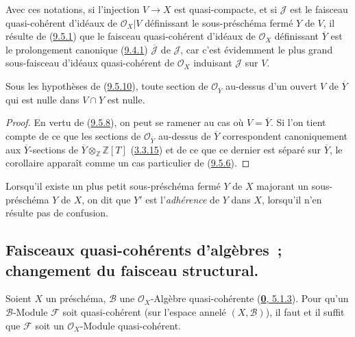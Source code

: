 Avec ces notations, si l'injection $V\to X$ est quasi-compacte, et si
$\mathscr{J}$ est le faisceau quasi-cohérent d'idéaux de
$\mathscr{O}_X|V$ définissant le sous-préschéma fermé $Y$ de $V$, il résulte
de (\hyperref[I.9.5.1-fr]{9.5.1}) que le faisceau quasi-cohérent d'idéaux de
$\mathscr{O}_X$ définissant $\overline{Y}$ est le prolongement canonique
(\hyperref[I.9.4.1-fr]{9.4.1}) $\overline{\mathscr{J}}$ de $\mathscr{J}$,
car c'est évidemment le plus grand sous-faisceau d'idéaux quasi-cohérent de
$\mathscr{O}_X$ induisant $\mathscr{J}$ sur $V$.
\begin{corollary}[9.5.11]
\label{I.9.5.11-fr}
Sous les hypothèses de (\hyperref[I.9.5.10-fr]{9.5.10}), toute section de
$\mathscr{O}_{\overline{Y}}$ au-dessus d'un ouvert $V$ de $\overline{Y}$
qui est nulle dans $V\cap Y$ est nulle.
\end{corollary}

\begin{proof}
En vertu de (\hyperref[I.9.5.8-fr]{9.5.8}), on peut se ramener au cas où
$V=\overline{Y}$. Si l'on tient compte de ce que les sections de
$\mathscr{O}_{\overline{Y}}$ au-dessus de $\overline{Y}$ correspondent
canoniquement aux $\overline{Y}$-sections de
$\overline{Y}\otimes_{\mathbb{Z}}\mathbb{Z}[T]$
(\hyperref[I.3.3.15-fr]{3.3.15}) et de ce que ce dernier est séparé sur
$\overline{Y}$, le corollaire apparaît comme un cas particulier de
(\hyperref[I.9.5.6-fr]{9.5.6}).
\end{proof}

Lorsqu'il existe un plus petit sous-préschéma fermé $Y$ de $X$
majorant un sous-préschéma $Y$ de $X$, on dit que $Y'$ est
l'\emph{adhérence} de $Y$ dans $X$, lorsqu'il n'en résulte pas de
confusion.

\subsection{Faisceaux quasi-cohérents d'algèbres~; changement du faisceau
structural.}
\label{subsection:I.9.6-fr}

\begin{proposition}[9.6.1]
\label{I.9.6.1-fr}
Soient $X$ un préschéma, $\mathscr{B}$ une $\mathscr{O}_X$-Algèbre
quasi-cohérente (\hyperref[0.5.1.3-fr]{\textbf{0}, 5.1.3}). Pour qu'un
$\mathscr{B}$-Module $\mathscr{F}$ soit quasi-cohérent (sur l'espace
annelé $(X,\mathscr{B})$), il faut et il suffit que $\mathscr{F}$ soit un
$\mathscr{O}_X$-Module quasi-cohérent.
\end{proposition}

